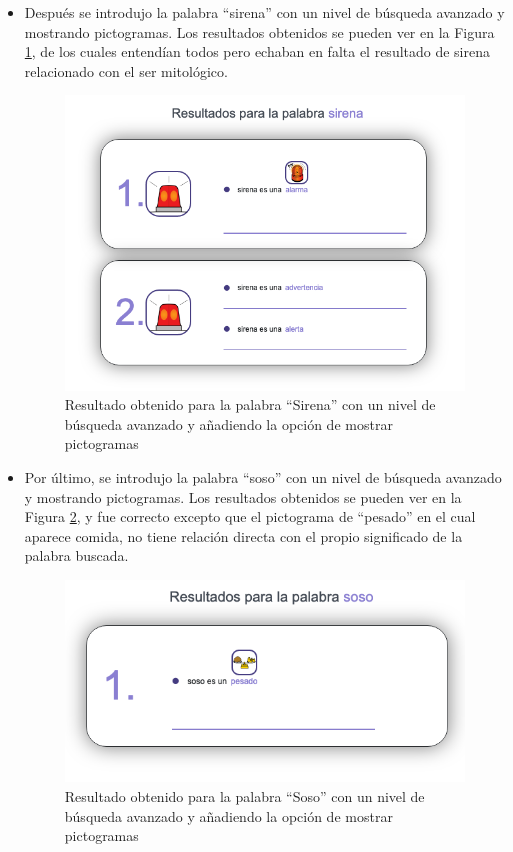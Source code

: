 \begin{itemize}
	
	\item Después se introdujo la palabra ``sirena'' con un nivel de búsqueda avanzado y mostrando pictogramas. Los resultados obtenidos se pueden ver en la Figura \ref{fig:sirenaAvanzado}, de los cuales entendían todos pero echaban en falta el resultado de sirena relacionado con el ser mitológico.
	\begin{figure}[!h]
		\includegraphics[width=.7\textwidth]{Imagenes/Bitmap/Capitulo4/EvaluacionFinal/6sirenaavanzado.png}
		\centering
		\caption{Resultado obtenido para la palabra ``Sirena'' con un nivel de búsqueda avanzado y añadiendo la opción de mostrar pictogramas}
		\label{fig:sirenaAvanzado}
	\end{figure}
	
	\item Por último, se introdujo la palabra ``soso'' con un nivel de búsqueda avanzado y mostrando pictogramas. Los resultados obtenidos se pueden ver en la Figura \ref{fig:sosoAvanzado}, y fue correcto excepto que el pictograma de ``pesado'' en el cual aparece comida, no tiene relación directa con el propio significado de la palabra buscada.
	\begin{figure}[!h]
		\includegraphics[width=.7\textwidth]{Imagenes/Bitmap/Capitulo4/EvaluacionFinal/7sosoavanzado.png}
		\centering
		\caption{Resultado obtenido para la palabra ``Soso'' con un nivel de búsqueda avanzado y añadiendo la opción de mostrar pictogramas}
		\label{fig:sosoAvanzado}
	\end{figure}
\end{itemize}


